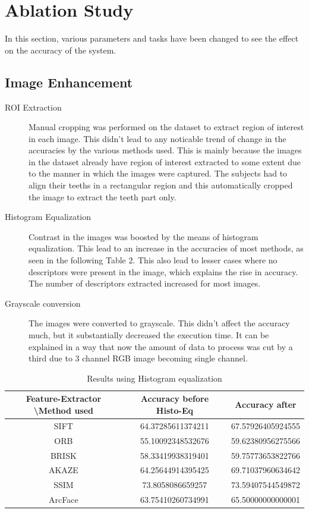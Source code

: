 \documentclass{article}
\begin{document}
\section{Ablation Study}
In this section, various parameters and tasks have been changed to see the effect on the accuracy of the system.
\subsection{Image Enhancement}
\begin{description}
   \item[ROI Extraction] Manual cropping was performed on the dataset to extract region of interest in each image. This didn't lead to any noticable trend of change in the accuracies by the various methods used. This is mainly because the images in the dataset already have region of interest extracted to some extent due to the manner in which the images were captured. The subjects had to align their teeths in a rectangular region and this automatically cropped the image to extract the teeth part only. 
   \item[Histogram Equalization] Contrast in the images was boosted by the means of histogram equalization. This lead to an increase in the accuracies of most methods, as seen in the following Table 2. This also lead to lesser cases where no descriptors were present in the image, which explains the rise in accuracy. The number of descriptors extracted increased for most images.
  \item[Grayscale conversion] The images were converted to grayscale. This didn't affect the accuracy much, but it substantially decreased the execution time. It can be explained in a way that now the amount of data to process was cut by a third due to 3 channel RGB image becoming single channel.
\end{description}
\begin{table}[htb]
\centering
\begin{tabular}{|c|c|c|}
\hline
Feature-Extractor \textbackslash Method used & Accuracy before Histo-Eq & Accuracy after    \\ \hline
SIFT                                         & 64.37285611374211        & 67.57926405924555 \\ \hline
ORB                                          & 55.10092348532676        & 59.62380956275566 \\ \hline
BRISK                                        & 58.33419938319401        & 59.75773653822766 \\ \hline
AKAZE                                        & 64.25644914395425        & 69.71037960634642 \\ \hline
SSIM                                         & 73.8058086659257         & 73.59407544549872 \\ \hline
ArcFace                                      & 63.75410260734991        & 65.50000000000001 \\ \hline
\end{tabular}
\caption{Results using Histogram equalization}
\end{table}
\end{document}
